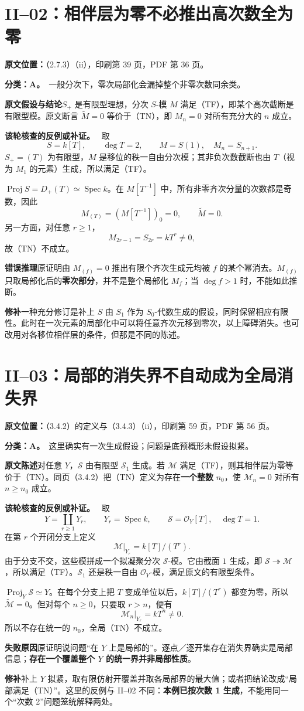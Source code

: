 \documentclass[UTF8,a4paper]{ctexbook}
\newcommand{\OO}{\mathscr O}
\DeclareMathOperator{\Spec}{Spec}
\newcommand{\SSS}{\mathscr S}
\DeclareMathOperator{\Proj}{Proj}
\newcommand{\MM}{\mathcal M}
\newcommand{\oldauditsrc}[1]{\par\noindent\textbf{原文位置：}#1。\par}
\newcommand{\kind}[2]{\noindent\textbf{分类：#1。}\ #2\par}
\newcommand{\lead}[1]{\par\noindent\textbf{#1}\quad}
\newenvironment{analysisproof}{\par\noindent\textbf{该轮核查的反例或补证。}\ }{\par}
\begin{document}
\section{II--02：相伴层为零不必推出高次数全为零}
\oldauditsrc{（2.7.3）（ii），印刷第 39 页，PDF 第 36 页}
\kind{A}{一般分次下，零次局部化会漏掉整个非零次数同余类。}
\lead{原文假设与结论}$S_+$ 是有限型理想，分次 $S$-模 $M$ 满足（TF），即某个高次截断是有限型模。原文断言 $\widetilde M=0$ 等价于（TN），即 $M_n=0$ 对所有充分大的 $n$ 成立。
\begin{analysisproof}
取
\[
S=k[T],\qquad\deg T=2,\qquad M=S(1),\quad M_n=S_{n+1}.
\]
$S_+=(T)$ 为有限型，$M$ 是移位的秩一自由分次模；其非负次数截断也由 $T$（视为 $M_1$ 的元素）生成，所以满足（TF）。

$\Proj S=D_+(T)\simeq\Spec k$。在 $M[T^{-1}]$ 中，所有非零齐次分量的次数都是奇数，因此
\[
M_{(T)}=(M[T^{-1}])_0=0,
\qquad\widetilde M=0.
\]
另一方面，对任意 $r\ge1$，
\[
M_{2r-1}=S_{2r}=kT^r\ne0,
\]
故（TN）不成立。
\end{analysisproof}
\lead{错误推理}原证明由 $M_{(f)}=0$ 推出有限个齐次生成元均被 $f$ 的某个幂消去。$M_{(f)}$ 只取局部化后的\textbf{零次部分}，并不是整个局部化 $M_f$；当 $\deg f>1$ 时，不能如此推断。
\lead{修补}一种充分修订是补上 $S$ 由 $S_1$ 作为 $S_0$-代数生成的假设，同时保留相应有限性。此时在一次元素的局部化中可以将任意齐次元移到零次，以上障碍消失。也可改用对各移位相伴层的条件，但那是不同的陈述。

\section{II--03：局部的消失界不自动成为全局消失界}
\oldauditsrc{（3.4.2）的定义与（3.4.3）（ii），印刷第 59 页，PDF 第 56 页}
\kind{A}{这里确实有一次生成假设；问题是底预概形未假设拟紧。}
\lead{原文陈述}对任意 $Y$，$\SSS$ 由有限型 $\SSS_1$ 生成。若 $\MM$ 满足（TF），则其相伴层为零等价于（TN）。同页（3.4.2）把（TN）定义为存在\textbf{一个整数} $n_0$，使 $\MM_n=0$ 对所有 $n\ge n_0$ 成立。
\begin{analysisproof}
取
\[
Y=\coprod_{r\ge1}Y_r,\qquad Y_r=\Spec k,\qquad
\SSS=\OO_Y[T],\quad\deg T=1.
\]
在第 $r$ 个开闭分支上定义
\[
\MM|_{Y_r}=k[T]/(T^r).
\]
由于分支不交，这些模拼成一个拟凝聚分次 $\SSS$-模。它由截面 $1$ 生成，即 $\SSS\twoheadrightarrow\MM$，所以满足（TF）。$\SSS_1$ 还是秩一自由 $\OO_Y$-模，满足原文的有限型条件。

$\Proj_Y\SSS\simeq Y$。在每个分支上把 $T$ 变成单位以后，$k[T]/(T^r)$ 都变为零，所以 $\widetilde{\MM}=0$。但对每个 $n\ge0$，只要取 $r>n$，便有
\[
\MM_n|_{Y_r}=kT^n\ne0.
\]
所以不存在统一的 $n_0$，全局（TN）不成立。
\end{analysisproof}
\lead{失败原因}原证明说问题“在 $Y$ 上是局部的”。逐点／逐开集存在消失界确实是局部信息；\textbf{存在一个覆盖整个 $Y$ 的统一界并非局部性质}。
\lead{修补}补上 $Y$ 拟紧，取有限仿射开覆盖并取各局部界的最大值；或者把结论改成“局部满足（TN）”。这里的反例与 II--02 不同：\textbf{本例已按次数 1 生成}，不能用同一个“次数 2”问题笼统解释两处。
\end{document}
